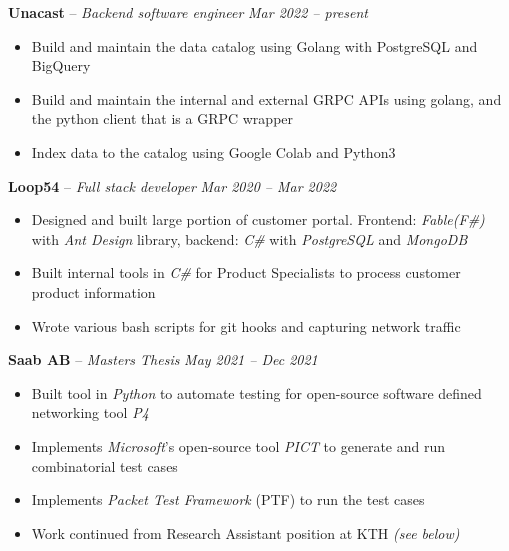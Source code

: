 \documentclass[10pt,letterpaper]{article}
\begin{document}
\headedsection
{\textbf{Unacast} -- \textit{Backend software engineer}}
{\textit{Mar 2022 -- present}} {
	\begin{itemize}[noitemsep,nolistsep]
		\item Build and maintain the data catalog using Golang with PostgreSQL and BigQuery
		\item Build and maintain the internal and external GRPC APIs using golang, and the python client that is a GRPC wrapper
		\item Index data to the catalog using Google Colab and Python3
	\end{itemize}
}
\vspace{-1mm}


\headedsection
{\textbf{Loop54} -- \textit{Full stack developer}}
{\textit{Mar 2020 -- Mar 2022}} {
	\begin{itemize}[noitemsep,nolistsep]
		\item Designed and built large portion of customer portal. Frontend: \textit{Fable(F\#)} with \textit{Ant Design} library, backend: \textit{C\#} with \textit{PostgreSQL} and \textit{MongoDB}
		\item Built internal tools in \textit{C\#} for Product Specialists to process customer product information
		\item Wrote various bash scripts for git hooks and capturing network traffic
	\end{itemize}
}
\vspace{-1mm}


\headedsection
{\textbf{Saab AB} -- \textit{Masters Thesis}}
{\textit{May 2021 -- Dec 2021}} {
	\begin{itemize}[noitemsep,nolistsep]
		\item Built tool in \textit{Python} to automate testing for open-source software defined networking tool \textit{P4}
		\item Implements \textit{Microsoft}'s open-source tool \textit{PICT} to generate and run combinatorial test cases
		\item Implements \textit{Packet Test Framework} (PTF) to run the test cases
		\item Work continued from Research Assistant position at KTH \textit{(see below)}
	\end{itemize}
}
\vspace{-1mm}
\end{document}
